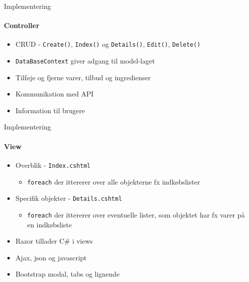 \begin{frame}{Implementering}
	\framesubtitle{Controller}
	\begin{itemize}
		\item CRUD - \texttt{Create()}, \texttt{Index()} og \texttt{Details()}, \texttt{Edit()}, \texttt{Delete()}
		\item \texttt{DataBaseContext} giver adgang til model-laget
		\vspace{15pt}
		\item Tilføje og fjerne varer, tilbud og ingredienser
		\item Kommunikation med API
		\item Information til brugere
	\end{itemize}
\end{frame}
\begin{frame}{Implementering}
	\framesubtitle{View}
	\begin{itemize}
		\item Overblik - \texttt{Index.cshtml}
		\begin{itemize}
			\item \texttt{foreach} der ittererer over alle objekterne fx indkøbslister
		\end{itemize}
		\item Specifik objekter - \texttt{Details.cshtml}
		\begin{itemize}
			\item \texttt{foreach} der ittererer over eventuelle lister, som objektet har fx varer på en indkøbsliste
		\end{itemize}
		\item Razor tillader C\# i views
		\item Ajax, json og javascript
		\item Bootstrap modal, tabs og lignende
	\end{itemize}
\end{frame}